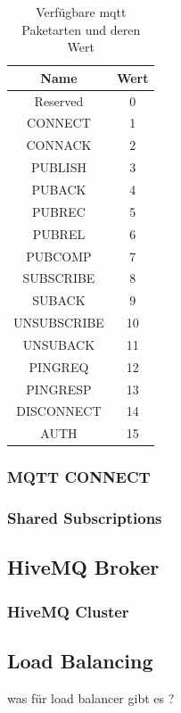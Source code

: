 \begin{table}[h!]
\centering
\renewcommand{\arraystretch}{1.5}
\begin{tabular}{|c|c|}
    \hline
    \textbf{Name} & \textbf{Wert} \\
    \hline
    \hline
    Reserved & 0 \\
    \hline
    CONNECT & 1 \\
    \hline
    CONNACK & 2 \\
    \hline
    PUBLISH & 3 \\
    \hline
    PUBACK & 4 \\
    \hline
    PUBREC & 5 \\
    \hline
    PUBREL & 6 \\
    \hline
    PUBCOMP & 7 \\
    \hline
    SUBSCRIBE & 8 \\
    \hline
    SUBACK & 9 \\
    \hline
    UNSUBSCRIBE & 10 \\
    \hline
    UNSUBACK & 11 \\
    \hline
    PINGREQ & 12 \\
    \hline
    PINGRESP & 13 \\
    \hline
    DISCONNECT & 14 \\
    \hline
    AUTH & 15 \\
    \hline
\end{tabular}
\caption{Verfügbare \ac{mqtt} Paketarten und deren Wert}
\label{table:mqtt-packet-types}
\end{table}

\subsubsection{MQTT CONNECT}
\subsubsection{Shared Subscriptions}


\newpage

\subsection{HiveMQ Broker}
\subsubsection{HiveMQ Cluster}
\subsection{Load Balancing}
was für load balancer gibt es ?
